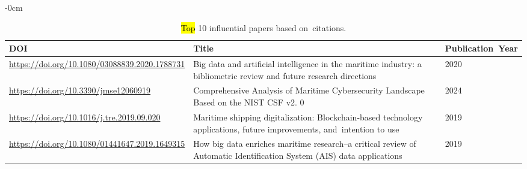 \documentclass[jmse,review,accept,pdftex,moreauthors]{Definitions/mdpi}
\begin{document}
\begin{table}[H]

	\caption{\hl{Top} %
 10 influential papers based on~citations.}

\begin{adjustwidth}{-\extralength}{0cm}
	\begin{tabularx}{\fulllength}{XXp{2.7cm}}
		\toprule
		\textbf{DOI} & \textbf{Title} & \textbf{Publication~Year}\\
		\midrule
		\url{https://doi.org/10.1080/03088839.2020.1788731} & Big data and artificial intelligence in the maritime industry: a bibliometric review and future research directions & 2020\\
		\url{https://doi.org/10.3390/jmse12060919} & Comprehensive Analysis of Maritime Cybersecurity Landscape Based on the NIST CSF v2. 0 & 2024\\
		\url{https://doi.org/10.1016/j.tre.2019.09.020} & Maritime shipping digitalization: Blockchain-based technology applications, future improvements, and~intention to use & 2019\\
		\url{https://doi.org/10.1080/01441647.2019.1649315} & How big data enriches maritime research–a critical review of Automatic Identification System (AIS) data applications & 2019\\
		
		\bottomrule
\end{tabularx}
\end{adjustwidth}
\end{table}
\end{document}
